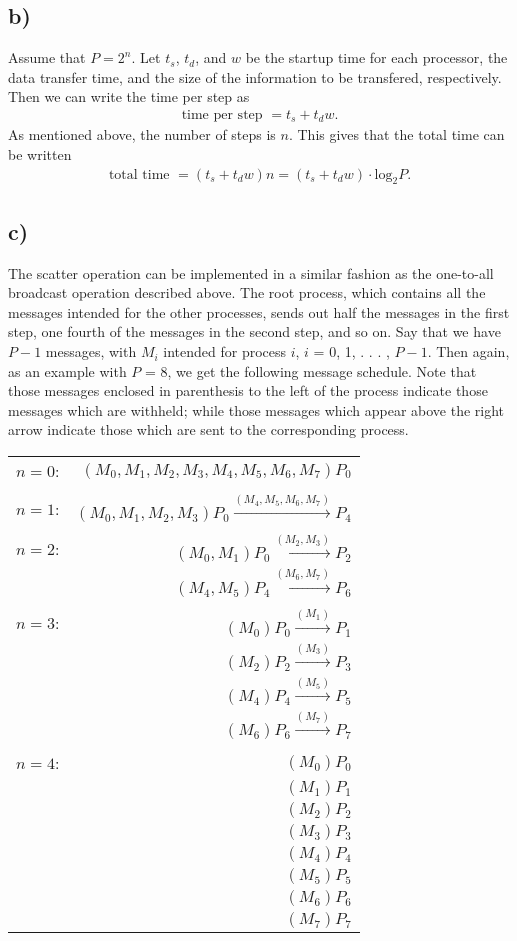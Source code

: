 \documentclass[a4paper,11pt]{article}
\newcommand{\ba}[1]{\begin{align*}    #1    \end{align*}}
\begin{document}
\subsection*{b)}
Assume that $P = 2^n$.  Let $t_s$, $t_d$, and $w$ be the startup time for each processor, the data transfer time, and the size of the information to be transfered, respectively.  Then we can write the time per step as 
\ba{
\text{time per step } = t_s + t_dw.}  
As mentioned above, the number of steps is $n$.  This gives that the total time can be written 
\ba{
\text{total time }=(t_s + t_dw) n = (t_s + t_dw) \cdot \text{log}_2{P}.
}

\subsection*{c)}
The scatter operation can be implemented in a similar fashion as the one-to-all broadcast operation described above.  The root process, which contains all the messages intended for the other processes, sends out half the messages in the first step, one fourth of the messages in the second step, and so on.  Say that we have $P-1$ messages, with $M_i$ intended for process $i$, $i$ = 0, 1, . . . , $P-1$.  Then again, as an example with $P$ = 8, we get the following message schedule.  Note that those messages enclosed in parenthesis to the left of the process indicate those messages which are withheld; while those messages which appear above the right arrow indicate those which are sent to the corresponding process.
\begin{center}
\begin{tabular}{l r}
$n=0$:  & $(M_0,M_1,M_2,M_3,M_4,M_5,M_6,M_7) P_0$ \\\\
 $n=1$: & $(M_0,M_1,M_2,M_3) P_0 \overset{(M_4,M_5,M_6,M_7)}{\longrightarrow} P_4$ \\\\
 $n=2$: & $(M_0,M_1) P_0 \overset{(M_2,M_3)}{ \longrightarrow} P_2$ \\
	 & $(M_4,M_5) P_4 \overset{(M_6,M_7) }{\longrightarrow} P_6$\\\\
 $n=3$: & $(M_0) P_0 \overset{(M_1)}{ \longrightarrow}  P_1$ \\
	 & $(M_2)P_2 \overset{(M_3)}{ \longrightarrow}  P_3$\\
	 & $(M_4)P_4 \overset{(M_5)}{ \longrightarrow}  P_5$\\
	 & $(M_6)P_6 \overset{(M_7)}{ \longrightarrow}    P_7$\\\\
$n=4$: & $(M_0)P_0$\\
& $(M_1)P_1$ \\
& $(M_2)P_2$ \\
& $(M_3)P_3 $\\
& $(M_4)P_4 $\\
& $(M_5)P_5$ \\
& $(M_6)P_6$ \\
& $(M_7)P_7$	 
\end{tabular}
\end{center}  
\end{document}

